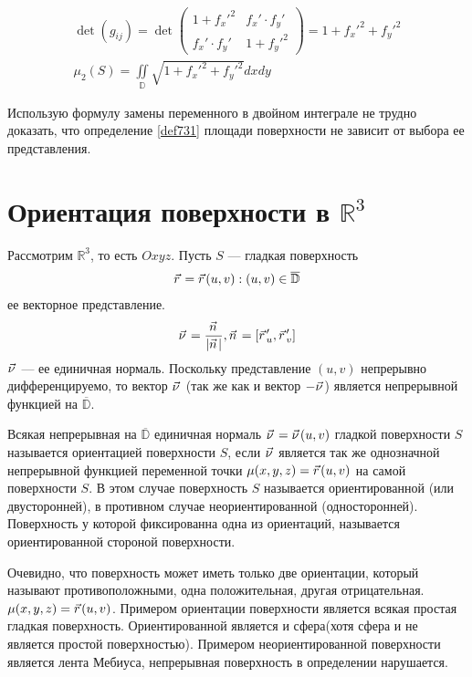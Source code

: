 \begin{gather*}
  \det (g_{ij}) = \det
  \begin{pmatrix}
    1 + f_x'^2 & f_x' \cdot f_y' \\
    f_x' \cdot f_y' & 1 + f_y'^2
  \end{pmatrix} =
  1 + f_x'^2 + f_y'^2 \\
  \mu_2(S) = \iint\limits_{\mathbb{D}} \sqrt{1 + f_x'^2 + f_y'^2} dx dy
\end{gather*}

\begin{remark}
  Использую формулу замены переменного в двойном интеграле не трудно доказать,
  что определение \eqref{def731} площади поверхности не зависит от выбора ее
  представления.
\end{remark}

\section{Ориентация поверхности в $\mathbb{R}^3$}
Рассмотрим $\mathbb{R}^3$, то есть $Oxyz$. Пусть $S$ --- гладкая поверхность
\begin{gather}
  \pvec r = \pvec r(u, v): (u, v) \in \overline{\mathbb{D}}
  \label{ch74:eq1}
\end{gather}
ее векторное представление.
\begin{gather}
  \pvec \nu = \frac{\pvec n}{|\pvec n|}, \pvec n = [\pvec r_u', \pvec r_v']
  \label{ch74:eq2}
\end{gather}
$\pvec \nu$ --- ее единичная нормаль. Поскольку представление $(u, v)$
непрерывно дифференцируемо, то вектор $\pvec \nu$ (так же как и вектор $-\pvec
\nu$) является непрерывной функцией на $\overline{\mathbb{D}}$.

\begin{definition}
  Всякая непрерывная на $\overline{\mathbb{D}}$ единичная нормаль $\pvec \nu =
  \pvec \nu(u, v)$ гладкой поверхности $S$ называется ориентацией поверхности
  $S$, если $\pvec \nu$ является так же однозначной непрерывной функцией
  переменной точки $\mu(x, y, z) = \pvec r(u, v)$ на самой поверхности $S$. В
  этом случае поверхность $S$ называется ориентированной (или двусторонней), в
  противном случае неориентированной (односторонней). Поверхность у которой
  фиксированна одна из ориентаций, называется ориентированной стороной
  поверхности.
\end{definition}
Очевидно, что поверхность может иметь только две ориентации, который называют
противоположными, одна положительная, другая отрицательная. $\mu(x, y, z) =
\pvec r(u, v)$. Примером ориентации поверхности является всякая простая гладкая
поверхность. Ориентированной является и сфера(хотя сфера и не является простой
поверхностью). Примером неориентированной поверхности является лента Мебиуса,
непрерывная поверхность в определении нарушается. \\

